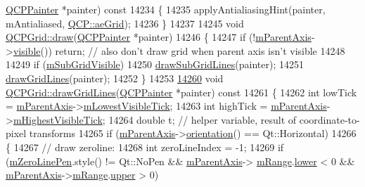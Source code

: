 \begin{DoxyCode}
      \hyperlink{a00047}{QCPPainter} *painter)\textcolor{keyword}{ const}
14234 \textcolor{keyword}{}\{
14235   applyAntialiasingHint(painter, mAntialiased, \hyperlink{a00143_ae55dbe315d41fe80f29ba88100843a0ca4fbb37118d62288af0ca601ff2b07a2f}{QCP::aeGrid});
14236 \}
14237 
14245 \textcolor{keywordtype}{void} \hyperlink{a00116_a2e9b3d14dffa43c79835869d488936c9}{QCPGrid::draw}(\hyperlink{a00047}{QCPPainter} *painter)
14246 \{
14247   \textcolor{keywordflow}{if} (!\hyperlink{a00116_aea80007cf54320e192a69054cd81504b}{mParentAxis}->\hyperlink{a00044_a10a3cc92e0fa63e4a929e61d34e275a7}{visible}()) \textcolor{keywordflow}{return}; \textcolor{comment}{// also don't draw grid when parent axis isn't
       visible}
14248   
14249   \textcolor{keywordflow}{if} (\hyperlink{a00116_a117dd29d26688e4651a5aae265e1f1b9}{mSubGridVisible})
14250     \hyperlink{a00116_afa5d9d12de419e881f381f2ab7cb414d}{drawSubGridLines}(painter);
14251   \hyperlink{a00116_a3aff10e993f6625e255c19e4f97a09d8}{drawGridLines}(painter);
14252 \}
14253 
\hypertarget{a00115_source_l14260}{}\hyperlink{a00116_a3aff10e993f6625e255c19e4f97a09d8}{14260} \textcolor{keywordtype}{void} \hyperlink{a00116_a3aff10e993f6625e255c19e4f97a09d8}{QCPGrid::drawGridLines}(\hyperlink{a00047}{QCPPainter} *painter)\textcolor{keyword}{ const}
14261 \textcolor{keyword}{}\{
14262   \textcolor{keywordtype}{int} lowTick = \hyperlink{a00116_aea80007cf54320e192a69054cd81504b}{mParentAxis}->\hyperlink{a00025_aebb24ba8734b7e054efc6e1ecc5414c7}{mLowestVisibleTick};
14263   \textcolor{keywordtype}{int} highTick = \hyperlink{a00116_aea80007cf54320e192a69054cd81504b}{mParentAxis}->\hyperlink{a00025_abb3b3ccce7e9779fef2be91ce1a46ef0}{mHighestVisibleTick};
14264   \textcolor{keywordtype}{double} t; \textcolor{comment}{// helper variable, result of coordinate-to-pixel transforms}
14265   \textcolor{keywordflow}{if} (\hyperlink{a00116_aea80007cf54320e192a69054cd81504b}{mParentAxis}->\hyperlink{a00025_a57483f2f60145ddc9e63f3af53959265}{orientation}() == Qt::Horizontal)
14266   \{
14267     \textcolor{comment}{// draw zeroline:}
14268     \textcolor{keywordtype}{int} zeroLineIndex = -1;
14269     \textcolor{keywordflow}{if} (\hyperlink{a00116_ad8f3f742873da937274c85359dc03f7e}{mZeroLinePen}.style() != Qt::NoPen && \hyperlink{a00116_aea80007cf54320e192a69054cd81504b}{mParentAxis}->
      \hyperlink{a00025_a1ee36773c49062d751560e11f90845f7}{mRange}.\hyperlink{a00049_aa3aca3edb14f7ca0c85d912647b91745}{lower} < 0 && \hyperlink{a00116_aea80007cf54320e192a69054cd81504b}{mParentAxis}->\hyperlink{a00025_a1ee36773c49062d751560e11f90845f7}{mRange}.\hyperlink{a00049_ae44eb3aafe1d0e2ed34b499b6d2e074f}{upper} > 0)

\end{DoxyCode}
